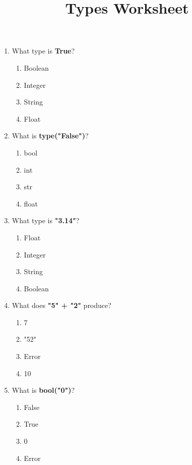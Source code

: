 \documentclass{article}
\title{\vspace{-3em}Types Worksheet\vspace{-2em}}
\begin{document}
\maketitle

\begin{multicols*}{4}
    \raggedright
    \begin{enumerate}
        \item \noindent What type is \textbf{True}? 

        \begin{enumerate}[label=(\Alph*)]
            \item Boolean
            \item Integer
            \item String
            \item Float
        \end{enumerate}

        \item \noindent What is \textbf{type("False")}?

        \begin{enumerate}[label=(\Alph*)]
            \item bool 
            \item int 
            \item str 
            \item float 
        \end{enumerate}

        \item What type is \textbf{"3.14"}?
        \begin{enumerate}[label=(\Alph*)]
            \item Float
            \item Integer
            \item String
            \item Boolean
        \end{enumerate}

        \item What does \textbf{"5" + "2"} produce?
        \begin{enumerate}[label=(\Alph*)]
            \item 7
            \item "52"
            \item Error
            \item 10
        \end{enumerate}

        \item What is \textbf{bool("0")}?
        \begin{enumerate}[label=(\Alph*)]
            \item False
            \item True
            \item 0
            \item Error
        \end{enumerate}


\end{enumerate}
\end{multicols*}
\end{document}
